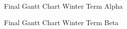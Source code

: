 \documentclass[onecolumn, draftclsnofoot,10pt, compsoc]{IEEEtran}
\begin{document}
\begin{figure}[htp] 
\caption{Final Gantt Chart Winter Term Alpha}
\end{figure}

\begin{figure}[htp] 
\caption{Final Gantt Chart Winter Term Beta}
\end{figure}
\end{document}
